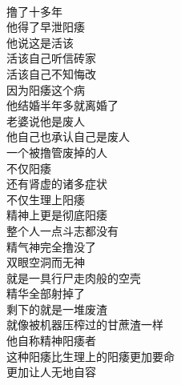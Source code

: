 \begin{poem}[精神阳痿者]
    \begin{multicols}{2}
        \begin{center}~\\
            撸了十多年 \\ 他得了早泄阳痿 \\ 他说这是活该 \\ 活该自己听信砖家 \\ 活该自己不知悔改 \\ 因为阳痿这个病 \\ 他结婚半年多就离婚了 \\ 老婆说他是废人 \\ 他自己也承认自己是废人 \\ 一个被撸管废掉的人 \\ 不仅阳痿 \\ 还有肾虚的诸多症状 \\ 不仅生理上阳痿 \\ 精神上更是彻底阳痿 \\ 整个人一点斗志都没有 \\ 精气神完全撸没了 \\ 双眼空洞而无神 \\ 就是一具行尸走肉般的空壳 \\ 精华全部射掉了 \\ 剩下的就是一堆废渣 \\ 就像被机器压榨过的甘蔗渣一样 \\ 他自称精神阳痿者 \\ 这种阳痿比生理上的阳痿更加要命 \\ 更加让人无地自容
        \end{center}
    \end{multicols}
\end{poem}

